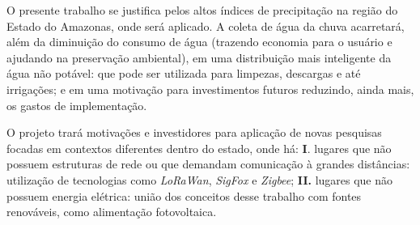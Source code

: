 O presente trabalho se justifica pelos altos índices de precipitação na região do Estado do Amazonas, onde será aplicado. A coleta de água da chuva acarretará, além da diminuição do consumo de água (trazendo economia para o usuário e ajudando na preservação ambiental), em uma distribuição mais inteligente da água não potável: que pode ser utilizada para limpezas, descargas e até irrigações; e em uma motivação para investimentos futuros reduzindo, ainda mais, os gastos de implementação.

O projeto trará motivações e investidores para aplicação de novas pesquisas focadas em contextos diferentes dentro do estado, onde há: \textbf{I}. lugares que não possuem estruturas de rede ou que demandam comunicação à grandes distâncias: utilização de tecnologias como \textit{LoRaWan}, \textit{SigFox} e \textit{Zigbee}; \textbf{II.} lugares que não possuem energia elétrica: união dos conceitos desse trabalho com fontes renováveis, como alimentação fotovoltaica.
